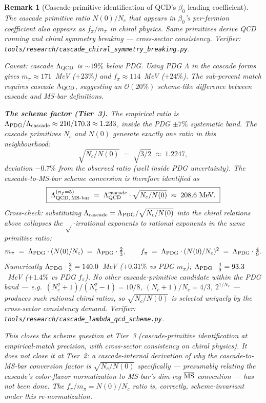 \documentclass[12pt,a4paper]{article}
\newtheorem*{remark}{Remark}
\begin{document}
\begin{remark}[Cascade-primitive identification of QCD's $\beta_0$ leading coefficient]
The cascade primitive ratio $N(0)/N_c$ that appears in $\beta_0$'s
per-fermion coefficient \emph{also} appears as $f_\pi/m_\pi$ in
chiral physics. Same primitives derive QCD running and chiral
symmetry breaking --- cross-sector consistency. Verifier:
\texttt{tools/research/cascade\_chiral\_symmetry\_breaking.py}.

Caveat: cascade $\Lambda_{\rm QCD}$ is $\sim 19\%$ below PDG. Using
PDG $\Lambda$ in the cascade forms gives $m_\pi \approx 171$~MeV
($+23\%$) and $f_\pi \approx 114$~MeV ($+24\%$). The sub-percent
match requires \emph{cascade} $\Lambda_{\rm QCD}$, suggesting an
$\mathcal{O}(20\%)$ scheme-like difference between cascade and
MS-bar definitions.

\medskip\noindent\textbf{The scheme factor (Tier~3).} The empirical
ratio is $\Lambda_{\rm PDG}/\Lambda_{\rm cascade}\approx 210/170.3
\approx 1.233$, inside the PDG $\pm 7\%$ systematic band. The cascade
primitives $N_c$ and $N(0)$ generate exactly one ratio in this
neighbourhood:
\[
\sqrt{N_c/N(0)} \;=\; \sqrt{3/2} \;\approx\; 1.2247,
\]
deviation $-0.7\%$ from the observed ratio (well inside PDG
uncertainty). The cascade-to-MS-bar scheme conversion is therefore
identified as
\[
\boxed{\;\Lambda_{{\rm QCD},\,{\rm MS\text{-}bar}}^{(n_f=5)}
       \;=\; \Lambda_{\rm QCD}^{\rm cascade}\cdot\sqrt{N_c/N(0)}
       \;\approx\; 208.6~\text{MeV}.\;}
\]
Cross-check: substituting $\Lambda_{\rm cascade} =
\Lambda_{\rm PDG}/\sqrt{N_c/N(0)}$ into the chiral relations
above collapses the $\sqrt{}$-irrational exponents to rational
exponents in the same primitive ratio:
\[
m_\pi \;=\; \Lambda_{\rm PDG}\cdot(N(0)/N_c)
       \;=\; \Lambda_{\rm PDG}\cdot\tfrac{2}{3}, \qquad
f_\pi \;=\; \Lambda_{\rm PDG}\cdot(N(0)/N_c)^2
       \;=\; \Lambda_{\rm PDG}\cdot\tfrac{4}{9}.
\]
Numerically $\Lambda_{\rm PDG}\cdot\tfrac{2}{3} = 140.0$~MeV
($+0.31\%$ vs PDG $m_\pi$); $\Lambda_{\rm PDG}\cdot\tfrac{4}{9}
= 93.3$~MeV ($+1.4\%$ vs PDG $f_\pi$). No other cascade-primitive
candidate within the PDG band --- e.g.\ $(N_c^2+1)/(N_c^2-1)=10/8$,
$(N_c+1)/N_c = 4/3$, $2^{1/N_c}$ --- produces such rational chiral
ratios, so $\sqrt{N_c/N(0)}$ is selected uniquely by the
cross-sector consistency demand. Verifier:
\texttt{tools/research/cascade\_lambda\_qcd\_scheme.py}.

This closes the scheme question at Tier~3 (cascade-primitive
identification at empirical-match precision, with cross-sector
consistency on chiral physics). It does \emph{not} close it at
Tier~2: a cascade-internal derivation of why the cascade-to-MS-bar
conversion factor is $\sqrt{N_c/N(0)}$ specifically --- presumably
relating the cascade's color-flavor normalization to MS-bar's
dim-reg $\overline{\rm MS}$ convention --- has not been done. The
$f_\pi/m_\pi = N(0)/N_c$ ratio is, correctly, scheme-invariant
under this re-normalization.


\end{remark}
\end{document}
